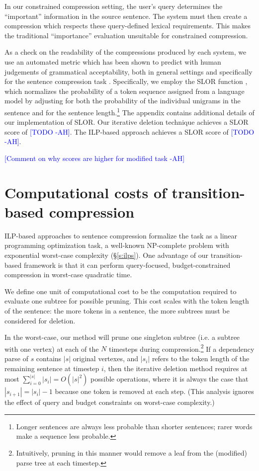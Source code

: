 \documentclass[11pt,a4paper]{article}
\newcommand{\ahcomment}[1]{\textcolor{blue}{[#1 -AH]}}
\begin{document}
In our constrained compression setting, the user's query determines the ``important'' information in the source sentence. The system must then create a compression which respects these query-defined lexical requirements. This makes the traditional ``importance'' evaluation unsuitable for constrained compression. 
 
As a check on the readability of the compressions produced by each system, we use an automated metric which has been shown to predict with human judgements of grammatical acceptability, both in general settings \cite{lau2015unsupervised} and specifically for the sentence compression task \cite{kannConl}. Specifically, we employ the SLOR function \cite{lau2015unsupervised}, which normalizes the probability of a token sequence assigned from a language model by adjusting for both the probability of the individual unigrams in the sentence and for the sentence length.\footnote{Longer sentences are always less probable than shorter sentences; rarer words make a sequence less probable.} The appendix contains additional details of our implementation of SLOR. Our iterative deletion technique achieves a SLOR score of \ahcomment{TODO}. The ILP-based approach achieves a SLOR score of \ahcomment{TODO}.

\ahcomment{Comment on why scores are higher for modified task}

\section{Computational costs of transition-based compression}\label{s:costs}

ILP-based approaches to sentence compression formalize the task as a linear programming optimization task, a well-known NP-complete problem with exponential worst-case complexity (\S\ref{s:ilps}). One advantage of our transition-based framework is that it can perform query-focused, budget-constrained compression in worst-case quadratic time. 

We define one unit of computational cost to be the computation required to evaluate one subtree for possible pruning. This cost scales with the token length of the sentence: the more tokens in a sentence, the more subtrees must be considered for deletion.  %

In the worst-case, our method will prune one singleton subtree (i.e. a subtree with one vertex) at each of the $N$ timesteps during compression.\footnote{Intuitively, pruning in this manner would remove a leaf from the (modified) parse tree at each timestep.} If a dependency parse of $s$ contains $|s|$ original vertexes, and $|s_i|$ refers to the token length of the remaining sentence at timestep $i$, then the iterative deletion method requires at most ${\sum_{i = 0}^{|s|} |s_i | = O(|s|^2)}$ possible operations, where it is always the case that $|s_{i + 1}| = |s_{i}|  - 1$ because one token is removed at each step. (This analysis ignores the effect of query and budget constraints on worst-case complexity.)
\end{document}
